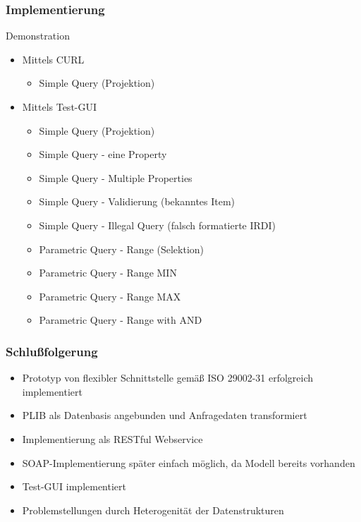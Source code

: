 \documentclass[serif,mathserif]{beamer}
\begin{document}
 \begin{frame}
  \frametitle{Implementierung}
  Demonstration
  
     \begin{itemize}
     \item Mittels CURL
          \begin{itemize}
          \item Simple Query (Projektion)
          \end{itemize}
     \item Mittels Test-GUI
          \begin{itemize}
          \item Simple Query (Projektion)
          \item Simple Query - eine Property
          \item Simple Query - Multiple Properties
          \item Simple Query - Validierung (bekanntes Item)
          \item Simple Query - Illegal Query (falsch formatierte IRDI)
          \item Parametric Query - Range (Selektion)
          \item Parametric Query - Range MIN
          \item Parametric Query - Range MAX
          \item Parametric Query - Range with AND
          \end{itemize}                 
     \end{itemize}
 \end{frame}


\begin{frame}
  \frametitle{Schlußfolgerung}
  
  \begin{itemize}
	\item Prototyp von flexibler Schnittstelle gemäß ISO 29002-31 erfolgreich implementiert
	\item PLIB als Datenbasis angebunden und Anfragedaten transformiert
	\item Implementierung als RESTful Webservice
	\item SOAP-Implementierung später einfach möglich, da Modell bereits vorhanden
	\item Test-GUI implementiert 
	\item Problemstellungen durch Heterogenität der Datenstrukturen
   \end{itemize}

\end{frame}
\end{document}
